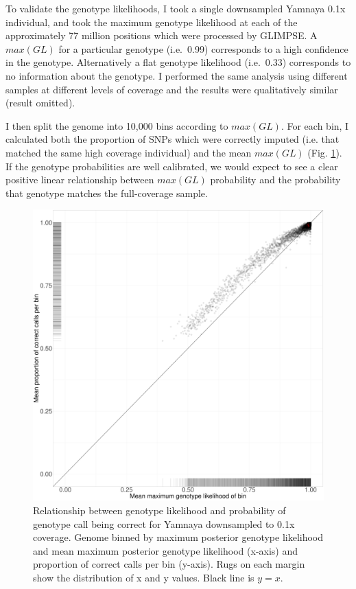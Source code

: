 To validate the genotype likelihoods, I took a single downsampled Yamnaya 0.1x individual, and took the maximum genotype likelihood at each of the approximately 77 million positions which were processed by GLIMPSE. A $max(GL)$ for a particular genotype (i.e.\ 0.99) corresponds to a high confidence in the genotype. Alternatively a flat genotype likelihood (i.e.\ 0.33) corresponds to no information about the genotype. I performed the same analysis using different samples at different levels of coverage and the results were qualitatively similar (result omitted).

I then split the genome into 10,000 bins according to $max(GL)$. For each bin, I calculated both the proportion of SNPs which were correctly imputed (i.e. that matched the same high coverage individual) and the mean $max(GL)$ (Fig. \ref{fig:Yamnaya_0.1x_GL_calibration}). If the genotype probabilities are well calibrated, we would expect to see a clear positive linear relationship between $max(GL)$ probability and the probability that genotype matches the full-coverage sample.  

\begin{figure}[htp]
    \centering
    \includegraphics[width=1.0\textwidth]{../images/chapter1/Yamnaya_0.1x_bin.pdf}
    \caption{Relationship between genotype likelihood and probability of genotype call being correct for Yamnaya downsampled to 0.1x coverage. Genome binned by maximum posterior genotype likelihood and mean maximum posterior genotype likelihood (x-axis) and proportion of correct calls per bin (y-axis). Rugs on each margin show the distribution of x and y values. Black line is $y=x$.}
    \label{fig:Yamnaya_0.1x_GL_calibration}
\end{figure}


